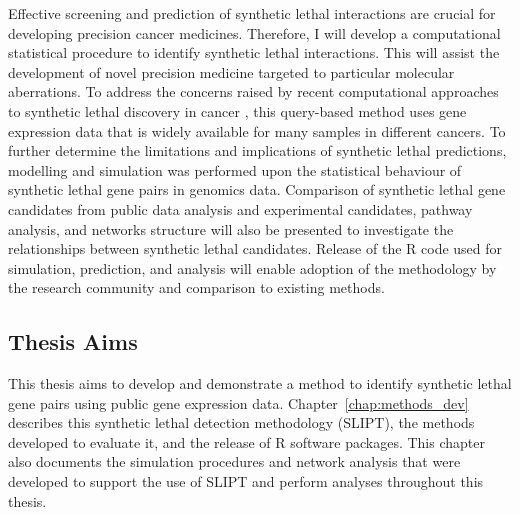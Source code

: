 Effective screening and prediction of \gls{synthetic lethal} interactions are crucial for developing precision cancer medicines. Therefore, I will develop a computational statistical procedure to identify \gls{synthetic lethal} interactions. This will assist the development of novel \gls{precision medicine} targeted to particular molecular aberrations. %
%
To address the concerns raised by recent computational approaches to \gls{synthetic lethal} discovery in cancer \citep{Jerby2014, Lu2015, Wappett2016}, this query-based method uses \gls{gene expression} data that is widely available for many samples in different cancers. %
To further determine the limitations and implications of \gls{synthetic lethal} predictions, modelling and simulation was performed upon the statistical behaviour of \gls{synthetic lethal} gene pairs in \glspl{genomic} data. Comparison of \gls{synthetic lethal} gene candidates from public data analysis and experimental candidates, pathway analysis, and networks structure will also be presented to investigate the relationships between \gls{synthetic lethal} candidates. Release of the R code used for simulation, prediction, and analysis will enable adoption of the methodology by the research community and comparison to existing methods. %

\subsection{Thesis Aims}

This thesis aims to develop and demonstrate a method to identify \gls{synthetic lethal} gene pairs using public \gls{gene expression} data. Chapter~\ref{chap:methods_dev} describes this \gls{synthetic lethal} detection methodology (\gls{SLIPT}), the methods developed to evaluate it, and the release of R software packages. This chapter also documents the simulation procedures and network analysis that were developed to support the use of \gls{SLIPT} and perform analyses throughout this thesis. 

